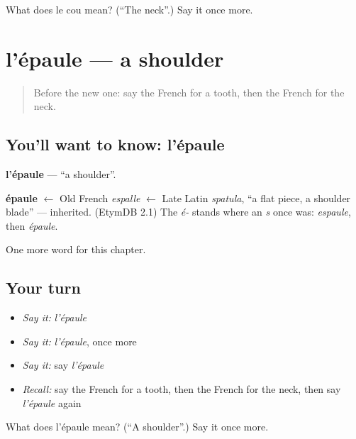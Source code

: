 \begin{tcolorbox}[breakable,colback=teal!4,colframe=teal!35!black,title={Before you move on}]
What does le cou mean? (\textquotedblleft{}The neck\textquotedblright{}.) Say it once more.
\end{tcolorbox}
\section[l'épaule]{l'épaule — a shoulder}

\label{lesson:FR-C50-epaule}



\begin{quote}
Before the new one: say the French for a tooth, then the French for the neck.
\end{quote}

\subsection*{You'll want to know: l'épaule}
\textbf{l'épaule} — \textquotedblleft{}a shoulder\textquotedblright{}.

\begin{cousinweb}
\textbf{épaule} $\leftarrow$ Old French \emph{espalle} $\leftarrow$ Late Latin \emph{spatula}, \textquotedblleft{}a flat piece, a shoulder blade\textquotedblright{} — inherited. (EtymDB 2.1) The \emph{é-} stands where an \emph{s} once was: \emph{espaule}, then \emph{épaule}.
\end{cousinweb}

\begin{grammarlens}[title={What you've built}]
One more word for this chapter.
\end{grammarlens}

\subsection*{Your turn}
\begin{itemize}
\raggedright
  \item \emph{Say it:} \emph{l'épaule}
  \item \emph{Say it:} \emph{l'épaule}, once more
  \item \emph{Say it:} say \emph{l'épaule}
  \item \emph{Recall:} say the French for a tooth, then the French for the neck, then say \emph{l'épaule} again
\end{itemize}

\begin{tcolorbox}[breakable,colback=teal!4,colframe=teal!35!black,title={Before you move on}]
What does l'épaule mean? (\textquotedblleft{}A shoulder\textquotedblright{}.) Say it once more.
\end{tcolorbox}
